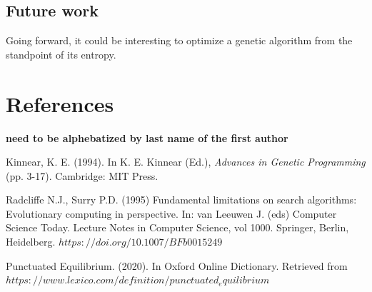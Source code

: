 \documentclass[11pt]{article}
\begin{document}
\subsection{Future work}
\label{sec:org0f04af1}

Going forward, it could be interesting to optimize a genetic algorithm
from the standpoint of its entropy.

\section{References}
\label{sec:org9dc046e}
\textbf{need to be alphebatized by last name of the first author}\\
\doublespacing

Kinnear, K. E. (1994). In K. E. Kinnear (Ed.), \emph{Advances in
Genetic Programming} (pp. 3-17). Cambridge: MIT Press.

Radcliffe N.J., Surry P.D. (1995) Fundamental limitations on search
algorithms: Evolutionary computing in perspective.  In: van Leeuwen
J. (eds) Computer Science Today. Lecture Notes in Computer Science,
vol 1000. Springer, Berlin, Heidelberg.
$https://doi.org/10.1007/BFb0015249$

Punctuated Equilibrium. (2020). In Oxford Online Dictionary. Retrieved
from $https://www.lexico.com/definition/punctuated_equilibrium$
\end{document}
